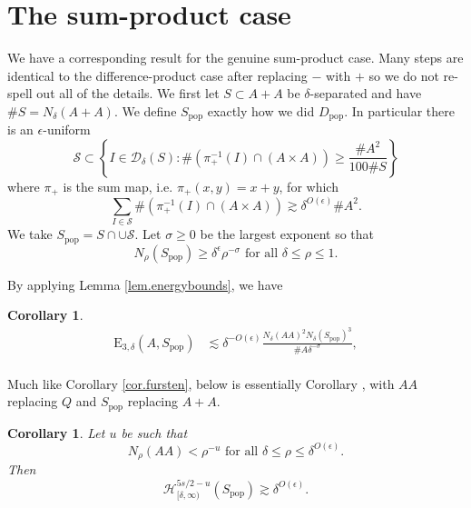 \documentclass[12pt]{amsart}
\newtheorem{corollary}[theorem]{Corollary}
\newcommand{\dem}{\de^{-O(\e)}}
\newcommand{\dep}{\de^{O(\e)}}
\newcommand{\depp}{\de^\e}
\newcommand{\spop}{S_{\mathrm{pop}}}
\newcommand{\1}{\mathbf{1}}
\newcommand{\en}[2]{\mathrm{E}_{#1,#2}}
\newcommand{\cont}[1]{\mathcal{H}^{#1}_{[\delta,\infty)}}
\newcommand{\de}{\delta}
\newcommand{\e}{\epsilon}
\newcommand{\cns}[2]{N_{{#1}}({#2})}
\newcommand{\cn}[1]{N_\de({#1})}
\begin{document}
\section{The sum-product case}\label{sec.sumprod}
We have a corresponding result for the genuine sum-product case. Many steps are identical to the difference-product case after replacing $-$ with $+$ so we do not re-spell out all of the details. We first let \(S \subset A+A\) be \(\delta\)-separated and have \(\# S = N_{\delta} (A+A)\). We define
\(S _{\text{pop}} \) exactly how we did \(D _{\text{pop}} \). In particular there is an
\(\epsilon\)-uniform
\[
	\mathcal{S} \subset \left\{ I \in \mathcal{D} _{\delta} (S) : \#\left( \pi_{+}  ^{-1} (I) \cap (A \times A) \right) \geq \frac{\# A ^{2}}{100 \# S}  \right\} 
\]
where \(\pi_{+} \) is the sum map, i.e. \(\pi_{+} (x,y)= x+y\), for which
\begin{equation} \label{eq:s-pop-fibre}
	\sum _{I \in \mathcal{S} } \# \left( \pi _{+} ^{-1} (I) \cap (A \times A) \right) \gtrsim \delta ^{O(\epsilon)}\# A ^{2}.
\end{equation}
We take \(S _{\text{pop}} = S \cap \cup \mathcal{S} \). Let $\sigma \geq 0$ be the largest exponent so that
\begin{equation}\label{eq.defofsigmasum}
  N_{\rho} (S_{\text{pop}} ) \geq \depp \rho^{-\sigma} \text{ for all } \delta \leq \rho \leq 1.
\end{equation}

By applying Lemma \ref{lem.energybounds}, we have
\begin{corollary}\label{cor:sum-energybounds}
		\begin{align}
			\en 3 \de (A,\spop) &\lesssim \dem\frac{\cn{AA}^2 \cn{\spop}^3}{\#A\de^{-\sigma}},\\
		\end{align}
        \end{corollary}
    Much like Corollary \ref{cor.fursten}, below is essentially Corollary \cite[Corollary 5.4]{doprod}, with $AA$ replacing $Q$ and \(S_{\text{pop}} \) replacing $A+A.$ 

    \begin{corollary}
		\label{cor.fursten-sum} 
		Let $u$ be such that 
		\begin{equation}\label{eq.upperbox}
			\cns{\rho}{AA} < \rho^{-u} \text{ for all } \delta \leq \rho \leq \delta^{O(\epsilon)}.
		\end{equation}
		Then \begin{equation}
			\label{c nh fdvhuivju rtgtig}
			\cont{5s/2 - u}(S_{\text{pop}} ) \gtrsim \dep .
		\end{equation}

	\end{corollary}
\end{document}
